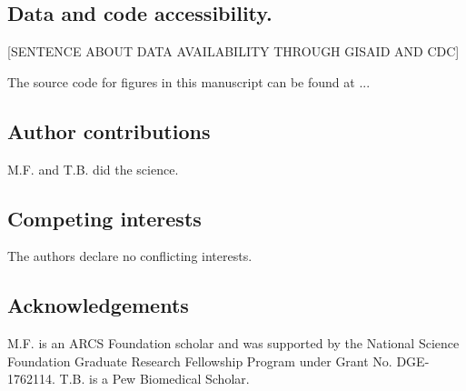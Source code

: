 \documentclass[11pt,oneside,letterpaper]{article}
\begin{document}

\subsection*{Data and code accessibility.}

[SENTENCE ABOUT DATA AVAILABILITY THROUGH GISAID AND CDC]

The source code for figures in this manuscript can be found at ...

\subsection*{Author contributions}

M.F. and T.B. did the science.

\subsection*{Competing interests}%

The authors declare no conflicting interests.

\subsection*{Acknowledgements}%

M.F. is an ARCS Foundation scholar and was supported by the National Science Foundation Graduate Research Fellowship Program under Grant No. DGE-1762114.
T.B. is a Pew Biomedical Scholar.
\end{document}
